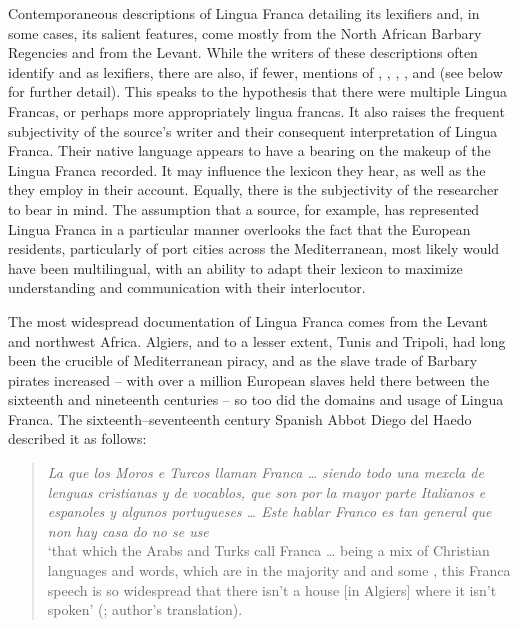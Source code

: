 \documentclass[output=paper]{langsci/langscibook}
\begin{document}
	Contemporaneous descriptions of Lingua Franca detailing its lexifiers and, in some cases, its salient features, come mostly from the North African Barbary Regencies and from the Levant. While the writers of these descriptions often identify  and  as lexifiers, there are also, if fewer, mentions of , , , ,  and  (see below for further detail). This speaks to the hypothesis that there were multiple Lingua Francas, or perhaps more appropriately lingua francas. It also raises the frequent subjectivity of the source’s writer and their consequent interpretation of Lingua Franca. Their native language appears to have a bearing on the makeup of the Lingua Franca recorded. It may influence the lexicon they hear, as well as the  they employ in their account. Equally, there is the subjectivity of the researcher to bear in mind. The assumption that a  source, for example, has represented Lingua Franca in a particular manner overlooks the fact that the European residents, particularly of port cities across the Mediterranean, most likely would have been multilingual, with an ability to adapt their lexicon to maximize understanding and communication with their interlocutor. 
	
	The most widespread documentation of Lingua Franca comes from the Levant and northwest Africa. Algiers, and to a lesser extent, Tunis and Tripoli, had long been the crucible of Mediterranean piracy, and as the slave trade of Barbary pirates increased – with over a million European slaves held there between the sixteenth and nineteenth centuries \citep[23]{Davis2004} – so too did the domains and usage of Lingua Franca. The sixteenth–seventeenth century Spanish Abbot Diego del Haedo described it as follows: 
	
\begin{quote}
	\textit{La que los Moros e Turcos llaman Franca … siendo todo una mexcla de lenguas cristianas y de vocablos, que son por la mayor parte Italianos e espanoles y algunos portugueses … Este hablar Franco es tan general que non hay casa do no se use}\medskip\\	
	‘that which the Arabs and Turks call Franca … being a mix of Christian languages and words, which are in the majority  and  and some , this Franca speech is so widespread that there isn’t a house [in Algiers] where it isn’t spoken’  (\citealt[24]{Haedo1612}; author’s translation).
\end{quote}
	
\end{document}

